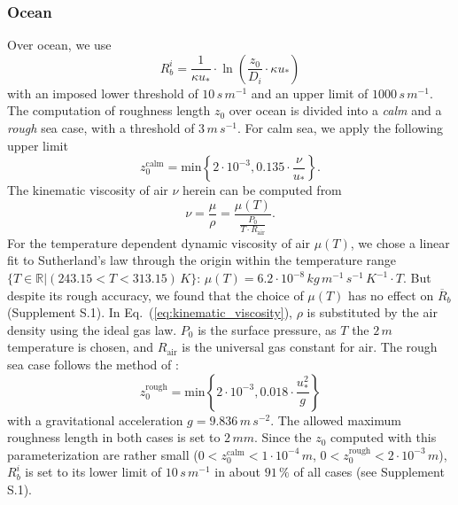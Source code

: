 \documentclass[gmd, manuscript]{copernicus}
\begin{document}
\subsubsection*{Ocean}
Over ocean, we use \citep[Eq.~(54),][]{ACP:Simpson2012}
\begin{equation}
  R_b^i = \frac{1}{\kappa u_*}\cdot\ln\left({\frac{z_0}{D_i}\cdot \kappa u_*}\right)
\end{equation}
with an imposed lower threshold of $10\,\unit{s\,m^{-1}}$ and an upper limit of $1000\,\unit{s\,m^{-1}}$. The computation of roughness length $z_0$ over ocean is divided into a \emph{calm} and a \emph{rough} sea case, with a threshold of $3\,\unit{m\,s^{-1}}$. For calm sea, we apply the following upper limit \citep[][with a slightly higher coefficient of $0.135$]{Hinze1975,Garratt1992}
\begin{equation}
  z_0^\text{calm} = \text{min}\left\{2\cdot10^{-3}, 0.135 \cdot \frac{\nu}{u_*}\right\}.
\end{equation}
The kinematic viscosity of air $\nu$ herein can be computed from 
\begin{equation}
  \nu = \frac{\mu}{\rho} = \frac{\mu(T)}{\frac{P_0}{T\cdot R_\text{air}}}.
  \label{eq:kinematic_viscosity}
\end{equation}
For the temperature dependent dynamic viscosity of air $\mu(T)$, we chose a linear fit to Sutherland's law through the origin within the temperature range $\{T \in \mathbb{R} | (243.15 < T < 313.15)\,\unit{K}\}$: $\mu(T) = 6.2\cdot 10^{-8}\,\unit{kg\,m^{-1}\,s^{-1}\,K^{-1}} \cdot T$. But despite its rough accuracy, we found that the choice of $\mu(T)$ has no effect on $\overline{R}_b$ (Supplement S.1). In Eq.~(\ref{eq:kinematic_viscosity}), $\rho$ is substituted by the air density using the ideal gas law. $P_0$ is the surface pressure, as $T$ the $2\,\unit{m}$ temperature is chosen, and $R_\text{air}$ is the universal gas constant for air.
The rough sea case follows the method of \citet{QJRMS:Charnock1955,JPO:Wu1980}:
\begin{equation}
  z_0^\text{rough} = \text{min}\left\{2\cdot10^{-3}, 0.018 \cdot \frac{u^2_*}{g}\right\}
\end{equation}
with a gravitational acceleration $g = 9.836\,\unit{m\,s^{-2}}$. The allowed maximum roughness length in both cases is set to $2\,\unit{mm}$. Since the $z_0$ computed with this parameterization are rather small ($0 < z_0^\text{calm} < 1\cdot 10^{-4}\,\unit{m}$, $0 < z_0^\text{rough} < 2 \cdot 10^{-3}\,\unit{m}$), $R^i_b$ is set to its lower limit of $10\,\unit{s\,m^{-1}}$ in about $91\,\unit{\%}$ of all cases (see Supplement S.1). 
\end{document}
